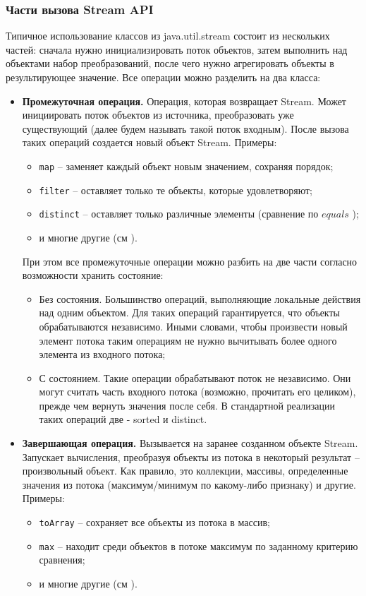 \subsubsection{Части вызова Stream API}
Типичное использование классов из java.util.stream состоит из нескольких частей: сначала 
нужно инициализировать поток объектов, затем выполнить над объектами набор преобразований, 
после чего нужно агрегировать объекты в результирующее значение. Все операции 
можно разделить на два класса:
\begin{itemize}
	\item \textbf{Промежуточная операция.} Операция, которая возвращает Stream. Может инициировать поток объектов из источника, преобразовать уже существующий (далее будем называть такой поток входным). После вызова таких операций создается новый объект Stream. Примеры:
	\begin{itemize}
		\item \texttt{map} -- заменяет каждый объект новым значением, сохраняя порядок;
		\item \texttt{filter} -- оставляет только те объекты, которые удовлетворяют;
		\item \texttt{distinct} -- оставляет только различные элементы (сравнение по $equals$ \cite{java:equals});
		\item и многие другие (см \cite{java:stream}).
	\end{itemize}
	При этом все промежуточные операции можно разбить на две части согласно возможности хранить состояние:
	\begin{itemize}
		\item Без состояния. Большинство операций, выполняющие локальные действия над одним 
		объектом. Для таких операций гарантируется, что объекты обрабатываются независимо. Иными словами, чтобы произвести новый элемент потока таким операциям не нужно вычитывать более одного элемента из входного потока;
		\item С состоянием. Такие операции обрабатывают поток не независимо. Они могут считать часть входного потока (возможно, прочитать его целиком), прежде чем вернуть значения после себя. В стандартной реализации таких операций две - sorted и distinct.
	\end{itemize}
	\item \textbf{Завершающая операция.} Вызывается на заранее созданном объекте Stream. Запускает вычисления, преобразуя объекты из потока в некоторый результат -- произвольный объект. Как правило, это коллекции, массивы, определенные значения из потока (максимум/минимум по какому-либо признаку) и другие. Примеры:
	\begin{itemize}
		\item \texttt{toArray} -- сохраняет все объекты из потока в массив;
		\item \texttt{max} -- находит среди объектов в потоке максимум по заданному критерию сравнения;
		\item и многие другие (см \cite{java:stream}).
	\end{itemize}
\end{itemize}

